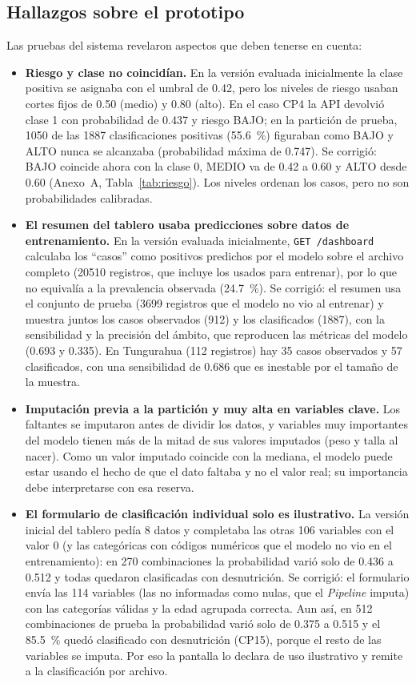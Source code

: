 \subsection{Hallazgos sobre el prototipo}
Las pruebas del sistema revelaron aspectos que deben tenerse en cuenta:
\begin{itemize}
  \item \textbf{Riesgo y clase no coincidían.} En la versión evaluada inicialmente la clase positiva se asignaba con el umbral de 0.42, pero los niveles de riesgo usaban cortes fijos de 0.50 (medio) y 0.80 (alto). En el caso CP4 la API devolvió clase 1 con probabilidad de 0.437 y riesgo BAJO; en la partición de prueba, 1050 de las 1887 clasificaciones positivas (\SI{55.6}{\percent}) figuraban como BAJO y ALTO nunca se alcanzaba (probabilidad máxima de 0.747). Se corrigió: BAJO coincide ahora con la clase 0, MEDIO va de 0.42 a 0.60 y ALTO desde 0.60 (Anexo~A, Tabla~\ref{tab:riesgo}). Los niveles ordenan los casos, pero no son probabilidades calibradas.
  \item \textbf{El resumen del tablero usaba predicciones sobre datos de entrenamiento.} En la versión evaluada inicialmente, \texttt{GET /dashboard} calculaba los ``casos'' como positivos predichos por el modelo sobre el archivo completo (\num{20510} registros, que incluye los usados para entrenar), por lo que no equivalía a la prevalencia observada (\SI{24.7}{\percent}). Se corrigió: el resumen usa el conjunto de prueba (\num{3699} registros que el modelo no vio al entrenar) y muestra juntos los casos observados (912) y los clasificados (\num{1887}), con la sensibilidad y la precisión del ámbito, que reproducen las métricas del modelo (0.693 y 0.335). En Tungurahua (112 registros) hay 35 casos observados y 57 clasificados, con una sensibilidad de 0.686 que es inestable por el tamaño de la muestra.
  \item \textbf{Imputación previa a la partición y muy alta en variables clave.} Los faltantes se imputaron antes de dividir los datos, y variables muy importantes del modelo tienen más de la mitad de sus valores imputados (peso y talla al nacer). Como un valor imputado coincide con la mediana, el modelo puede estar usando el hecho de que el dato faltaba y no el valor real; su importancia debe interpretarse con esa reserva.
  \item \textbf{El formulario de clasificación individual solo es ilustrativo.} La versión inicial del tablero pedía 8 datos y completaba las otras 106 variables con el valor 0 (y las categóricas con códigos numéricos que el modelo no vio en el entrenamiento): en 270 combinaciones la probabilidad varió solo de 0.436 a 0.512 y todas quedaron clasificadas con desnutrición. Se corrigió: el formulario envía las 114 variables (las no informadas como nulas, que el \textit{Pipeline} imputa) con las categorías válidas y la edad agrupada correcta. Aun así, en 512 combinaciones de prueba la probabilidad varió solo de 0.375 a 0.515 y el \SI{85.5}{\percent} quedó clasificado con desnutrición (CP15), porque el resto de las variables se imputa. Por eso la pantalla lo declara de uso ilustrativo y remite a la clasificación por archivo.

\end{itemize}
